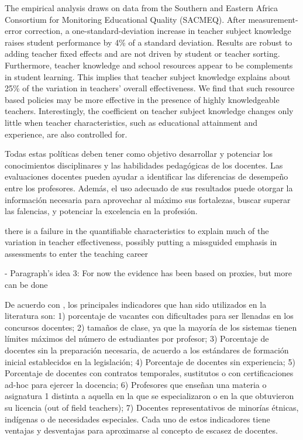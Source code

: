 The empirical analysis draws on data from the Southern and Eastern Africa Consortium for Monitoring Educational Quality (SACMEQ). After measurement-error correction, a one-standard-deviation increase in teacher subject knowledge raises student performance by 4\% of a standard deviation. Results are robust to adding teacher fixed effects and are not driven by student or teacher sorting. Furthermore, teacher knowledge and school resources appear to be complements in student learning. This implies that teacher subject knowledge explains about 25\% of the variation in teachers’ overall effectiveness. We find that such resource based policies may be more effective in the presence of highly knowledgeable teachers. Interestingly, the coefficient on teacher subject knowledge changes only little when teacher characteristics, such as educational attainment and experience, are also controlled for. \citep{Bietenbeck_et_al_2018}


Todas estas políticas deben tener como objetivo desarrollar y potenciar los conocimientos disciplinares y las habilidades pedagógicas de los docentes. Las evaluaciones docentes pueden ayudar a identificar las diferencias de desempeño entre los profesores. Además, el uso adecuado de sus resultados puede otorgar la información necesaria para aprovechar al máximo sus fortalezas, buscar superar las falencias, y potenciar la excelencia en la profesión. \citep{Hincapie_et_al_2020}

there is a failure in the quantifiable characteristics to explain much of the variation in teacher effectiveness, possibly putting a missguided emphasis in assessments to enter the teaching career \citep{Hanushek_et_al_2012}



- Paragraph's idea 3: For now the evidence has been based on proxies, but more can be done

De acuerdo con \citep{Sutcher_et_al_2016}, los principales indicadores que han sido utilizados en la literatura son: 1) porcentaje de vacantes con dificultades para ser llenadas en los concursos docentes; 2) tamaños de clase, ya que la mayoría de los sistemas tienen límites máximos del número de estudiantes por profesor; 3) Porcentaje de docentes sin la preparación necesaria, de acuerdo a los estándares de formación inicial establecidos en la legislación; 4) Porcentaje de docentes sin experiencia; 5) Porcentaje de docentes con contratos temporales, sustitutos o con certificaciones ad-hoc para ejercer la docencia; 6) Profesores que enseñan una materia o asignatura 1 distinta a aquella en la que se especializaron o en la que obtuvieron su licencia (out of field teachers); 7) Docentes representativos de minorías étnicas, indígenas o de necesidades especiales. Cada uno de estos indicadores tiene ventajas y desventajas para aproximarse al concepto de escasez de docentes.


